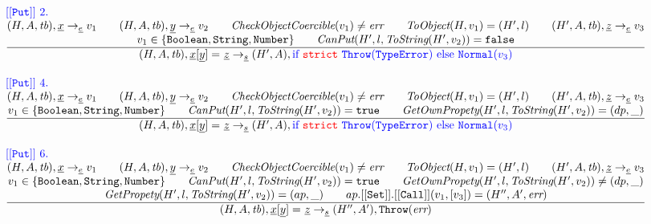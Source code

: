 \documentclass[a4paper, leqno]{amsart}
\newcommand{\rulesep}{\quad\quad}
\newcommand{\stmt}{s}
\newcommand{\expr}{e}
\newcommand{\ir}[1]{\ensuremath{\underline{#1}}}
\newcommand{\irid}{\ir{x}}
\newcommand{\reject}{\inblue\mbox{if \strict}\ {\tt Throw}(\te)\ \mbox{else}\ {\tt Normal}(v_3)}
\def\inred{\color{red}}
\def\inblue{\color{blue}}
\newcommand{\strict}{{\inred\tt strict}}
\newcommand{\false}{{\tt false}}
\newcommand{\true}{{\tt true}}
\newcommand{\tb}{\emph{tb}}
\newcommand{\err}{\emph{err}}
\newcommand{\te}{{\tt TypeError}}
\newcommand{\hf}[1]{\emph{#1}}
\newcommand{\state}{\ensuremath{(H,A,\tb)}}
\newcommand{\evale}{\ensuremath{(H,A,\tb)}}
\def\inred{\color{red}}
\def\inblue{\color{blue}}
\begin{document}
\[\begin{array}{l@{~~}l@{~~}ll}
{\inblue {\tt[[Put]]}\ 2.}\\
\frac{\begin{matrix}
\evale, \irid \rightarrow_{\ir\expr} v_1
\rulesep
\evale, \ir{y} \rightarrow_{\ir\expr} v_2
\rulesep
\hf{CheckObjectCoercible}(v_1) \not= \err
\rulesep
\hf{ToObject}(H, v_1) = (H',l)
\rulesep
(H', A, \tb), \ir{z} \rightarrow_{\ir\expr} v_3
\\
v_1 \in \{{\tt Boolean, String, Number}\}
\rulesep
\hf{CanPut}(H', l, \hf{ToString}(H', v_2)) = \false
\end{matrix}}{\begin{matrix}
\state, \irid{\tt[}\ir{y}{\tt] =} \ \ir{z} \rightarrow_{\ir\stmt}
(H',A), \reject
\end{matrix}}
\\[2em]


{\inblue {\tt[[Put]]}\ 4.}\\
\frac{\begin{matrix}
\evale, \irid \rightarrow_{\ir\expr} v_1
\rulesep
\evale, \ir{y} \rightarrow_{\ir\expr} v_2
\rulesep
\hf{CheckObjectCoercible}(v_1) \not= \err
\rulesep
\hf{ToObject}(H, v_1) = (H',l)
\rulesep
(H', A, \tb), \ir{z} \rightarrow_{\ir\expr} v_3
\\
v_1 \in \{{\tt Boolean, String, Number}\}
\rulesep
\hf{CanPut}(H', l, \hf{ToString}(H', v_2)) = \true
\rulesep
\hf{GetOwnPropety}(H', l, \hf{ToString}(H', v_2)) = (dp, \_)
\end{matrix}}{\begin{matrix}
\state, \irid{\tt[}\ir{y}{\tt] =} \ \ir{z} \rightarrow_{\ir\stmt}
(H',A), \reject
\end{matrix}}
\\[2em]



{\inblue {\tt[[Put]]}\ 6.}\\
\frac{\begin{matrix}
\evale, \irid \rightarrow_{\ir\expr} v_1
\rulesep
\evale, \ir{y} \rightarrow_{\ir\expr} v_2
\rulesep
\hf{CheckObjectCoercible}(v_1) \not= \err
\rulesep
\hf{ToObject}(H, v_1) = (H',l)
\rulesep
(H', A, \tb), \ir{z} \rightarrow_{\ir\expr} v_3
\\
v_1 \in \{{\tt Boolean, String, Number}\}
\rulesep
\hf{CanPut}(H', l, \hf{ToString}(H', v_2)) = \true
\rulesep
\hf{GetOwnPropety}(H', l, \hf{ToString}(H', v_2)) \not= (dp, \_)
\\
\hf{GetPropety}(H', l, \hf{ToString}(H', v_2)) = (ap, \_)
\rulesep
ap.{\tt[[Set]]}.{\tt[[Call]]}(v_1, [v_3]) = (H'', A', \err)
\end{matrix}}{\begin{matrix}
\state, \irid{\tt[}\ir{y}{\tt] =} \ \ir{z} \rightarrow_{\ir\stmt}
(H'',A'), {\tt Throw}(\err)
\end{matrix}}
\\[2em]



\end{array}\]
\end{document}
